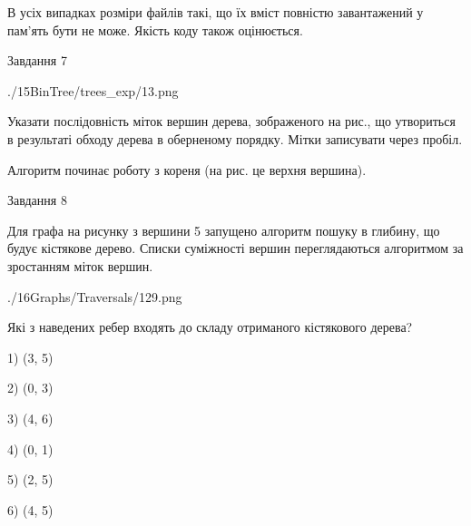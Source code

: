 \documentclass[12pt, ukrainian]{article}
\begin{document}
{В усіх випадках розміри файлів такі, що їх вміст повністю завантажений у пам'ять бути не може. Якість коду також оцінюється.



\vspace{10mm}\par

\newpage
\begin{minipage}[t]{9.7cm}
               
{\begin{center}Завдання {7}\end{center}}
\vspace{-6mm}

\begin{center}
	{./15BinTree/trees_exp/13.png}
\end{center}
Указати послідовність міток вершин дерева, зображеного на рис., що утвориться в результаті обходу дерева в оберненому порядку. Мітки записувати через пробіл.\par Алгоритм починає роботу з кореня (на рис. це верхня вершина).\par

\end{minipage}
\vline \hspace{8mm}
\begin{minipage}[t]{8.0cm}
               
{\begin{center}Завдання {8}\end{center}}
\vspace{-6mm}
Для графа на рисунку з вершини 5 запущено алгоритм пошуку в глибину, що будує кістякове дерево. Списки суміжності вершин переглядаються алгоритмом за зростанням міток вершин.\par
\begin{center}
	{./16Graphs/Traversals/129.png}
\end{center}
\par Які з наведених ребер входять до складу отриманого кістякового дерева?\par
1) (3, 5)\par
2) (0, 3)\par
3) (4, 6)\par
4) (0, 1)\par
5) (2, 5)\par
6) (4, 5)\par
{\vskip 15pt} \par


\end{minipage}}
\end{document}
